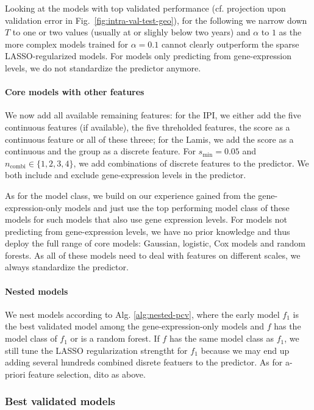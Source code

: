 Looking at the models with top validated performance (cf. projection upon validation error in Fig.\
\ref{fig:intra-val-test-geo}), for the following we narrow down $T$ to one or 
two values (usually at or slighly below two years) and $\alpha$ to $1$ as the more complex models 
trained for $\alpha = \num{0.1}$ cannot clearly outperform the sparse LASSO-regularized models. For 
models only predicting from gene-expression levels, we do not standardize the predictor anymore.

\paragraph{Core models with other features}
We now add all available remaining features: for the 
IPI, we either add the five continuous features (if available), the five threholded features, the 
score as a continuous feature or all of these threee; for the Lamis, %
we add the score as a continuous and the group as a discrete feature. For $s_\text{min} = \num{0.05}$ 
and $n_\text{combi} \in \{1, 2, 3, 4 \}$, we add combinations of discrete features to the predictor. 
We both include and exclude gene-expression levels in the predictor.

As for the model class, we build on our experience gained from the gene-expression-only models and 
just use the top performing model class of these models for such models that also use gene 
expression levels. For models not predicting from gene-expression levels, we have no prior 
knowledge and thus deploy the full range of core models: Gaussian, logistic, Cox models and random 
forests. As all of these models need to deal with features on different scales, we always 
standardize the predictor.


\paragraph{Nested models}
We nest models according to Alg. \ref{alg:nested-pcv}, where the early model $f_1$ is the best 
validated model among the gene-expression-only models and $f$ has the model class of $f_1$ or is 
a random forest. If $f$ has the same model class as $f_1$, we still tune the LASSO regularization 
strengtht for $f_1$ because we may end up adding several hundreds combined disrete featuers to the 
predictor. As for a-priori feature selection, dito as above.

\subsubsection{Best validated models}

